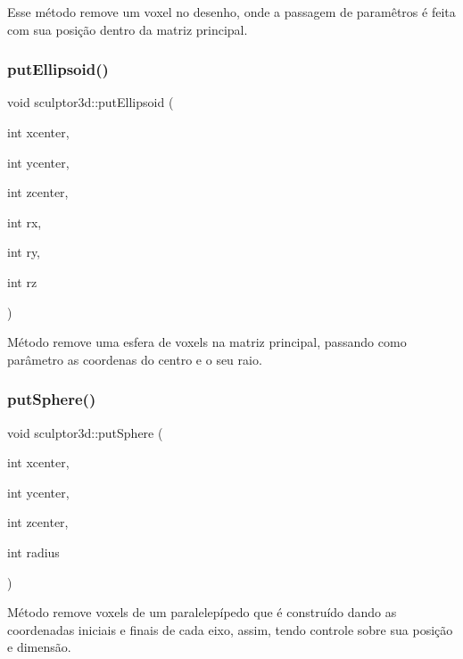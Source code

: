 Esse método remove um voxel no desenho, onde a passagem de paramêtros é feita com sua posição dentro da matriz principal. \mbox{\label{classsculptor3d_a0dbd7e2f4ad70f379a38678df1fe7583}} 
\subsubsection{\texorpdfstring{put\+Ellipsoid()}{putEllipsoid()}}
{\footnotesize\ttfamily void sculptor3d\+::put\+Ellipsoid (\begin{DoxyParamCaption}\item[{int}]{xcenter,  }\item[{int}]{ycenter,  }\item[{int}]{zcenter,  }\item[{int}]{rx,  }\item[{int}]{ry,  }\item[{int}]{rz }\end{DoxyParamCaption})}

Método remove uma esfera de voxels na matriz principal, passando como parâmetro as coordenas do centro e o seu raio. \mbox{\label{classsculptor3d_a81b399736b253ef298e7cf04feed9607}} 
\subsubsection{\texorpdfstring{put\+Sphere()}{putSphere()}}
{\footnotesize\ttfamily void sculptor3d\+::put\+Sphere (\begin{DoxyParamCaption}\item[{int}]{xcenter,  }\item[{int}]{ycenter,  }\item[{int}]{zcenter,  }\item[{int}]{radius }\end{DoxyParamCaption})}

Método remove voxels de um paralelepípedo que é construído dando as coordenadas iniciais e finais de cada eixo, assim, tendo controle sobre sua posição e dimensão. \mbox{\label{classsculptor3d_a15cb3ad622cf1b85f3c5811af1fe1ff3}} 
